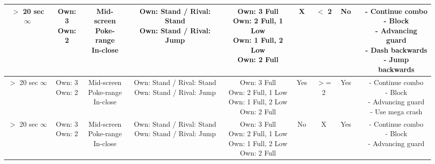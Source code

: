\documentclass{article}
\begin{document}
\begin{landscape}
\begin{table}[h!]
\begin{center}
\begin{tabular*}{27cm}{c|c|c|c|c|c|c|c|c|c}
      \makecell{$>$ 20 sec \\ $\infty$} & \makecell {Own: 3 \\ Own: 2} & \makecell{Mid-screen \\ Poke-range\\ In-close} & \makecell{Own: Stand / Rival: Stand \\ Own: Stand / Rival: Jump} & \makecell {Own: 3 Full \\ Own: 2 Full, 1 Low \\ Own: 1 Full, 2 Low \\ Own: 2 Full} & X & $<$ 2 & No & & \makecell{- Continue combo \\ - Block \\ - Advancing guard \\ - Dash backwards \\ - Jump backwards}\\
      \hline
      \makecell{$>$ 20 sec \\ $\infty$} & \makecell {Own: 3 \\ Own: 2} & \makecell{Mid-screen \\ Poke-range\\ In-close} & \makecell{Own: Stand / Rival: Stand \\ Own: Stand / Rival: Jump} & \makecell {Own: 3 Full \\ Own: 2 Full, 1 Low \\ Own: 1 Full, 2 Low \\ Own: 2 Full} & Yes & $>$= 2 & Yes & & \makecell{- Continue combo \\ - Block \\ - Advancing guard \\ - Use mega crash}\\
      \hline
      \makecell{$>$ 20 sec \\ $\infty$} & \makecell {Own: 3 \\ Own: 2} & \makecell{Mid-screen \\ Poke-range\\ In-close} & \makecell{Own: Stand / Rival: Stand \\ Own: Stand / Rival: Jump} & \makecell {Own: 3 Full \\ Own: 2 Full, 1 Low \\ Own: 1 Full, 2 Low \\ Own: 2 Full} & No & X & Yes & & \makecell{- Continue combo \\ - Block \\ - Advancing guard}\\
      \hline

\end{tabular*}
\end{center}
\end{table}
\end{landscape}
\end{document}
